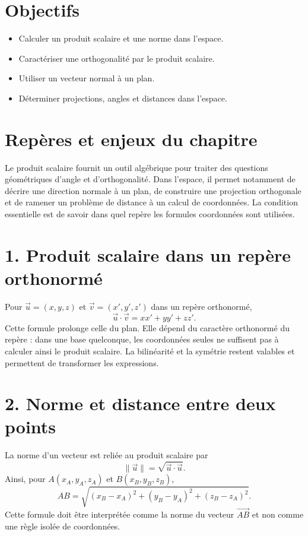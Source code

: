 
\section{Objectifs}
\begin{itemize}
\item Calculer un produit scalaire et une norme dans l’espace.
\item Caractériser une orthogonalité par le produit scalaire.
\item Utiliser un vecteur normal à un plan.
\item Déterminer projections, angles et distances dans l’espace.
\end{itemize}

\section{Repères et enjeux du chapitre}
Le produit scalaire fournit un outil algébrique pour traiter des questions géométriques d'angle et d'orthogonalité. Dans l'espace, il permet notamment de décrire une direction normale à un plan, de construire une projection orthogonale et de ramener un problème de distance à un calcul de coordonnées. La condition essentielle est de savoir dans quel repère les formules coordonnées sont utilisées.

\section{1. Produit scalaire dans un repère orthonormé}
Pour $\vec u=(x,y,z)$ et $\vec v=(x',y',z')$ dans un repère orthonormé,
\[
\vec u\cdot\vec v=xx'+yy'+zz'.
\]
Cette formule prolonge celle du plan. Elle dépend du caractère orthonormé du repère : dans une base quelconque, les coordonnées seules ne suffisent pas à calculer ainsi le produit scalaire. La bilinéarité et la symétrie restent valables et permettent de transformer les expressions.

\section{2. Norme et distance entre deux points}
La norme d'un vecteur est reliée au produit scalaire par
\[
\|\vec u\|=\sqrt{\vec u\cdot\vec u}.
\]
Ainsi, pour $A(x_A,y_A,z_A)$ et $B(x_B,y_B,z_B)$,
\[
AB=\sqrt{(x_B-x_A)^2+(y_B-y_A)^2+(z_B-z_A)^2}.
\]
Cette formule doit être interprétée comme la norme du vecteur $\overrightarrow{AB}$ et non comme une règle isolée de coordonnées.

